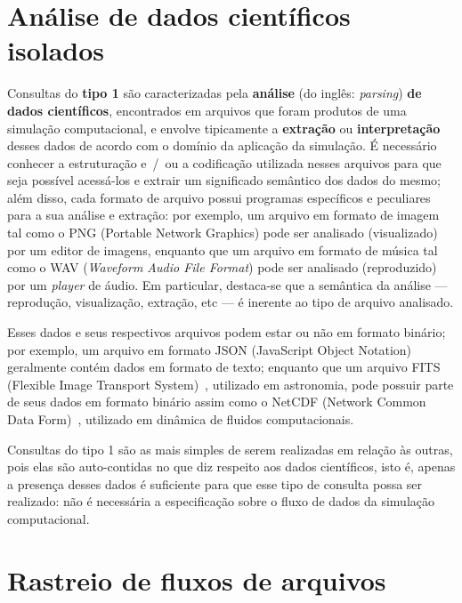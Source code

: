 \section{Análise de dados científicos isolados}%
\label{sec:analise-de-dados-cientificos-isolados}

Consultas do \textbf{tipo 1} são caracterizadas pela \textbf{análise} (do inglês: \textit{parsing}) \textbf{de dados científicos}, encontrados em arquivos que foram produtos de uma simulação computacional, e envolve tipicamente a \textbf{extração} ou \textbf{interpretação} desses dados de acordo com o domínio da aplicação da simulação. É necessário conhecer a estruturação e~/~ou a codificação utilizada nesses arquivos para que seja possível acessá-los e extrair um significado semântico dos dados do mesmo; além disso, cada formato de arquivo possui programas específicos e peculiares para a sua análise e extração: por exemplo, um arquivo em formato de imagem tal como o  PNG (Portable Network Graphics) pode ser analisado (visualizado) por um editor de imagens, enquanto que um arquivo em formato de música tal como o  WAV (\textit{Waveform Audio File Format}) pode ser analisado (reproduzido) por um \textit{player} de áudio. Em particular, destaca-se que a semântica da análise --- reprodução, visualização, extração, etc --- é inerente ao tipo de arquivo analisado.

Esses dados e seus respectivos arquivos podem estar ou não em formato binário; por exemplo, um arquivo em formato  JSON (JavaScript Object Notation) geralmente contém dados em formato de texto; enquanto que um arquivo FITS (Flexible Image Transport System)~\cite{greisen2002representations}, utilizado em astronomia, pode possuir parte de seus dados em formato binário assim como o NetCDF (Network Common Data Form)~\cite{rew1990netcdf}, utilizado em dinâmica de fluidos computacionais.

Consultas do tipo 1 são as mais simples de serem realizadas em relação às outras, pois elas são auto-contidas no que diz respeito aos dados científicos, isto é, apenas a presença desses dados é suficiente para que esse tipo de consulta possa ser realizado: não é necessária a especificação sobre o fluxo de dados da simulação computacional.


\section{Rastreio de fluxos de arquivos}%
\label{sec:rastreio-de-fluxos-de-arquivos}

